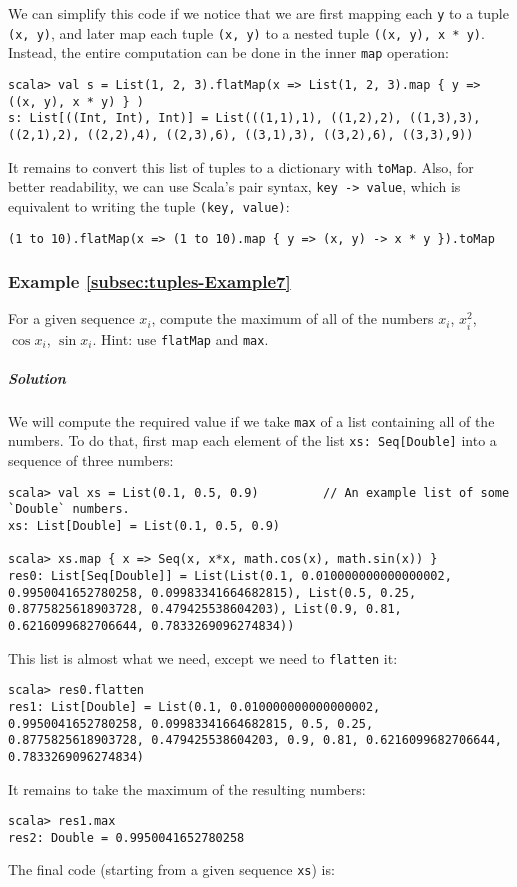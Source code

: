 We can simplify this code if we notice that we are first mapping each
\lstinline!y! to a tuple \lstinline!(x, y)!, and later map each
tuple \lstinline!(x, y)! to a nested tuple \lstinline!((x, y), x * y)!.
Instead, the entire computation can be done in the inner \lstinline!map!
operation:
\begin{lstlisting}
scala> val s = List(1, 2, 3).flatMap(x => List(1, 2, 3).map { y => ((x, y), x * y) } )
s: List[((Int, Int), Int)] = List(((1,1),1), ((1,2),2), ((1,3),3), ((2,1),2), ((2,2),4), ((2,3),6), ((3,1),3), ((3,2),6), ((3,3),9))
\end{lstlisting}
It remains to convert this list of tuples to a dictionary with \lstinline!toMap!.
Also, for better readability, we can use Scala\textsf{'}s pair syntax, \lstinline!key -> value!,
which is equivalent to writing the tuple \lstinline!(key, value)!:

\begin{lstlisting}
(1 to 10).flatMap(x => (1 to 10).map { y => (x, y) -> x * y }).toMap
\end{lstlisting}


\subsubsection{Example \label{subsec:tuples-Example7}\ref{subsec:tuples-Example7}}

For a given sequence $x_{i}$, compute the maximum of all of the numbers
$x_{i}$, $x_{i}^{2}$, $\cos x_{i}$, $\sin x_{i}$. Hint: use \lstinline!flatMap!
and \lstinline!max!.

\subparagraph{Solution}

We will compute the required value if we take \lstinline!max! of
a list containing all of the numbers. To do that, first map each element
of the list \lstinline!xs: Seq[Double]! into a sequence of three
numbers:
\begin{lstlisting}
scala> val xs = List(0.1, 0.5, 0.9)         // An example list of some `Double` numbers.
xs: List[Double] = List(0.1, 0.5, 0.9)

scala> xs.map { x => Seq(x, x*x, math.cos(x), math.sin(x)) }
res0: List[Seq[Double]] = List(List(0.1, 0.010000000000000002, 0.9950041652780258, 0.09983341664682815), List(0.5, 0.25, 0.8775825618903728, 0.479425538604203), List(0.9, 0.81, 0.6216099682706644, 0.7833269096274834))
\end{lstlisting}
This list is almost what we need, except we need to \lstinline!flatten!
it:
\begin{lstlisting}
scala> res0.flatten
res1: List[Double] = List(0.1, 0.010000000000000002, 0.9950041652780258, 0.09983341664682815, 0.5, 0.25, 0.8775825618903728, 0.479425538604203, 0.9, 0.81, 0.6216099682706644, 0.7833269096274834) 
\end{lstlisting}
It remains to take the maximum of the resulting numbers:
\begin{lstlisting}
scala> res1.max
res2: Double = 0.9950041652780258
\end{lstlisting}
The final code (starting from a given sequence \lstinline!xs!) is:

